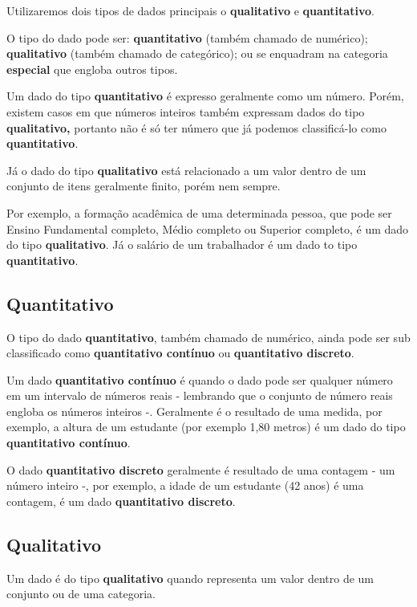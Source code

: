 \documentclass[
]{book}
\begin{document}
Utilizaremos dois tipos de dados principais o \textbf{qualitativo} e \textbf{quantitativo}.

O tipo do dado pode ser: \textbf{quantitativo} (também chamado de numérico); \textbf{qualitativo} (também chamado de categórico); ou se enquadram na categoria \textbf{especial} que engloba outros tipos.

Um dado do tipo \textbf{quantitativo} é expresso geralmente como um número. Porém, existem casos em que números inteiros também expressam dados do tipo \textbf{qualitativo,} portanto não é só ter número que já podemos classificá-lo como \textbf{quantitativo}.

Já o dado do tipo \textbf{qualitativo} está relacionado a um valor dentro de um conjunto de itens geralmente finito, porém nem sempre.

Por exemplo, a formação acadêmica de uma determinada pessoa, que pode ser Ensino Fundamental completo, Médio completo ou Superior completo, é um dado do tipo \textbf{qualitativo}. Já o salário de um trabalhador é um dado to tipo \textbf{quantitativo}.

\subsection{Quantitativo}\label{quantitativo}

O tipo do dado \textbf{quantitativo}, também chamado de numérico, ainda pode ser sub classificado como \textbf{quantitativo contínuo} ou \textbf{quantitativo discreto}.

Um dado \textbf{quantitativo contínuo} é quando o dado pode ser qualquer número em um intervalo de números reais - lembrando que o conjunto de número reais engloba os números inteiros -. Geralmente é o resultado de uma medida, por exemplo, a altura de um estudante (por exemplo 1,80 metros) é um dado do tipo \textbf{quantitativo contínuo}.

O dado \textbf{quantitativo discreto} geralmente é resultado de uma contagem - um número inteiro -, por exemplo, a idade de um estudante (42 anos) é uma contagem, é um dado \textbf{quantitativo discreto}.

\subsection{Qualitativo}\label{qualitativo}

Um dado é do tipo \textbf{qualitativo} quando representa um valor dentro de um conjunto ou de uma categoria.
\end{document}
